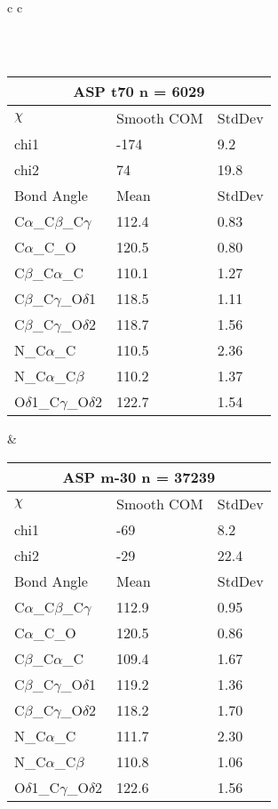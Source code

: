 \begin{longtable}{ c c }
\begin{tabular}{ l l l }
  \end{tabular}
  \\
  \begin{tabular}{ l l l }
  \toprule
  \multicolumn{3}{c}{ASP \textbf{t70} n = 6029} \\ \toprule
  $\chi$       & Smooth COM & StdDev \\ \midrule
  chi1 & -174 & 9.2 \\ 
  chi2 & 74 & 19.8 \\ \midrule
  Bond Angle   & Mean     & StdDev \\ \midrule
  C$\alpha$\_C$\beta$\_C$\gamma$ & 112.4 & 0.83\\
  C$\alpha$\_C\_O & 120.5 & 0.80\\
  C$\beta$\_C$\alpha$\_C & 110.1 & 1.27\\
  C$\beta$\_C$\gamma$\_O$\delta$1 & 118.5 & 1.11\\
  C$\beta$\_C$\gamma$\_O$\delta$2 & 118.7 & 1.56\\
  N\_C$\alpha$\_C & 110.5 & 2.36\\
  N\_C$\alpha$\_C$\beta$ & 110.2 & 1.37\\
  O$\delta$1\_C$\gamma$\_O$\delta$2 & 122.7 & 1.54\\
  \bottomrule
  \end{tabular}
  &
  \begin{tabular}{ l l l }
  \toprule
  \multicolumn{3}{c}{ASP \textbf{m-30} n = 37239} \\ \toprule
  $\chi$       & Smooth COM & StdDev \\ \midrule
  chi1 & -69 & 8.2 \\ 
  chi2 & -29 & 22.4 \\ \midrule
  Bond Angle   & Mean     & StdDev \\ \midrule
  C$\alpha$\_C$\beta$\_C$\gamma$ & 112.9 & 0.95\\
  C$\alpha$\_C\_O & 120.5 & 0.86\\
  C$\beta$\_C$\alpha$\_C & 109.4 & 1.67\\
  C$\beta$\_C$\gamma$\_O$\delta$1 & 119.2 & 1.36\\
  C$\beta$\_C$\gamma$\_O$\delta$2 & 118.2 & 1.70\\
  N\_C$\alpha$\_C & 111.7 & 2.30\\
  N\_C$\alpha$\_C$\beta$ & 110.8 & 1.06\\
  O$\delta$1\_C$\gamma$\_O$\delta$2 & 122.6 & 1.56\\
  \bottomrule
  \end{tabular}
  \\
  
\end{longtable}

